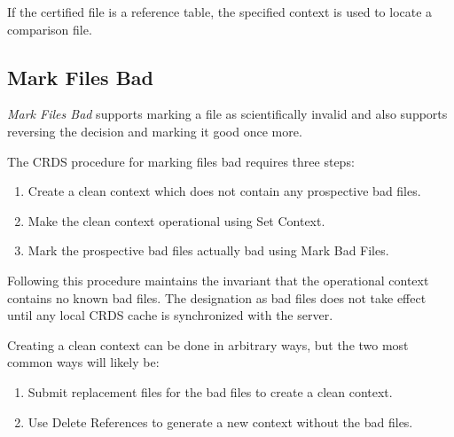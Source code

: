 \documentclass[letterpaper,10pt,english]{sphinxmanual}
\begin{document}
If the certified file is a reference table,  the specified context is used to
locate a comparison file.


\subsection{Mark Files Bad}
\label{web_site_use:mark-files-bad}
\emph{Mark Files Bad} supports marking a file as scientifically invalid and
also supports reversing the decision and marking it good once more.

The CRDS procedure for marking files bad requires three steps:
\begin{enumerate}
\item {} 
Create a clean context which does not contain any prospective bad files.

\item {} 
Make the clean context operational using Set Context.

\item {} 
Mark the prospective bad files actually bad using Mark Bad Files.

\end{enumerate}

Following this procedure maintains the invariant that the operational context
contains no known bad files.   The designation as bad files does not take
effect until any local CRDS cache is synchronized with the server.

Creating a clean context can be done in arbitrary ways,  but the two most
common ways will likely be:
\begin{enumerate}
\item {} 
Submit replacement files for the bad files to create a clean context.

\item {} 
Use Delete References to generate a new context without the bad files.

\end{enumerate}
\begin{figure}[htbp]
\centering

\end{figure}
\end{document}
